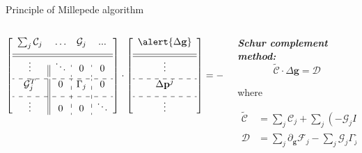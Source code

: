 \documentclass{ikpKoeln}
\begin{document}
\begin{frame}[t]{Principle of Millepede algorithm}
\begin{columns}[t]
\begin{column}{0.5 \textwidth}
			\vspace*{-0.9em}
			\setlength\extrarowheight{6pt}
			\scriptsize{
				$$ \left[  \begin{array}{c||c:c:c}
							\sum_j \mathcal{C}_j & \ldots & \mathcal{G}_j & ...    \\[6pt] \hline\hline
							\vdots               & \ddots & 0             & 0      \\[4pt] \hdashline
							\mathcal{G}^T_j      & 0      & \Gamma_j      & 0      \\[6pt] \hdashline
							\vdots               & 0      & 0             & \ddots \\
						\end{array}  \right] \cdot
					\left[ \begin{array}{c}
							\alert{\Delta \mathbf{g}} \\[6pt] \hline\hline
							\vdots                    \\[4pt] \hdashline
							\Delta \mathbf{p}^j       \\[6pt] \hdashline
							\vdots                    \\
						\end{array} \right] =
					-\left[ \begin{array}{c}
							\sum_j\partial_\mathbf{g} \mathcal{F}_j \\[6pt] \hline\hline
							\vdots                                  \\[4pt] \hdashline
							\partial_{\mathbf{p}^j} \mathcal{F}     \\[6pt] \hdashline
							\vdots                                  \\
						\end{array} \right]
				$$
			}
		\end{column}
		\pause
		\begin{column}{0.4 \textwidth}
			\textbf{\textit{Schur complement method:}}
			$$\tilde{\mathcal{C}} \cdot \Delta \mathbf{g} = \mathcal{D}$$
			\vspace*{-1.5em}

			where
			\vspace*{-1.5em}

			\begin{align*}
				\tilde{\mathcal{C}} & = \sum_j \mathcal{C}_j + \sum_j \left(-\mathcal{G}_j \Gamma^{-1}_j \mathcal{G}^T_j \right)                       \\
				\mathcal{D}         & = \sum_j\partial_\mathbf{g} \mathcal{F}_j - \sum_j\mathcal{G}_j \Gamma^{-1}_j\partial_{\mathbf{p}^j} \mathcal{F}
			\end{align*}
			\vspace*{-1.5em}


\end{column}
\end{columns}
\end{frame}
\end{document}
